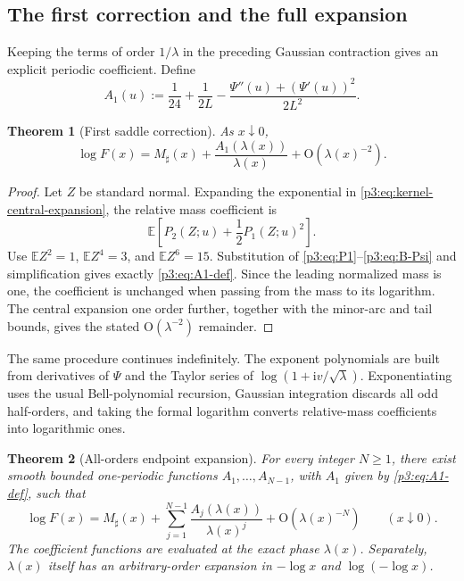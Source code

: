\documentclass[11pt]{article}
\numberwithin{equation}{section}
\newtheorem{theorem}{Theorem}[section]
\theoremstyle{definition}
\theoremstyle{remark}
\newcommand{\ii}{\mathrm i}
\newcommand{\Oh}{\mathrm O}
\begin{document}
\subsection{The first correction and the full expansion}

Keeping the terms of order $1/\lambda$ in the preceding Gaussian contraction
gives an explicit periodic coefficient.  Define
\begin{equation}\label{p3:eq:A1-def}
\boxed{
 A_1(u):=\frac1{24}+\frac1{2L}
 -\frac{\Psi''(u)+(\Psi'(u))^2}{2L^2}.}
\end{equation}

\begin{theorem}[First saddle correction]\label{p3:thm:first-correction}
As $x\downarrow0$,
\begin{equation}\label{p3:eq:first-correction}
 \log F(x)=M_\sharp(x)
 +\frac{A_1(\lambda(x))}{\lambda(x)}
 +\Oh(\lambda(x)^{-2}).
\end{equation}
\end{theorem}

\begin{proof}
Let $Z$ be standard normal.  Expanding the exponential in
\eqref{p3:eq:kernel-central-expansion}, the relative mass coefficient is
\begin{equation}\label{p3:eq:gaussian-contraction}
 \mathbb E\left[P_2(Z;u)+\frac12P_1(Z;u)^2\right].
\end{equation}
Use
$\mathbb EZ^2=1$, $\mathbb EZ^4=3$, and $\mathbb EZ^6=15$.
Substitution of \eqref{p3:eq:P1}--\eqref{p3:eq:B-Psi} and simplification gives
exactly \eqref{p3:eq:A1-def}.  Since the leading normalized mass is one, the
coefficient is unchanged when passing from the mass to its logarithm.  The
central expansion one order further, together with the minor-arc and tail
bounds, gives the stated $\Oh(\lambda^{-2})$ remainder.
\end{proof}

The same procedure continues indefinitely.  The exponent polynomials are
built from derivatives of $\Psi$ and the Taylor series of
$\log(1+\ii v/\sqrt\lambda)$.  Exponentiating uses the usual Bell-polynomial
recursion, Gaussian integration discards all odd half-orders, and taking the
formal logarithm converts relative-mass coefficients into logarithmic ones.

\begin{theorem}[All-orders endpoint expansion]\label{p3:thm:all-orders}
For every integer $N\ge1$, there exist smooth bounded one-periodic functions
$A_1,\ldots,A_{N-1}$, with $A_1$ given by \eqref{p3:eq:A1-def}, such that
\begin{equation}\label{p3:eq:all-orders}
\boxed{
 \log F(x)=M_\sharp(x)
 +\sum_{j=1}^{N-1}\frac{A_j(\lambda(x))}{\lambda(x)^j}
 +\Oh(\lambda(x)^{-N})
 \qquad(x\downarrow0).}
\end{equation}
The coefficient functions are evaluated at the exact phase $\lambda(x)$.
Separately, $\lambda(x)$ itself has an arbitrary-order expansion in
$-\log x$ and $\log(-\log x)$.
\end{theorem}
\end{document}

